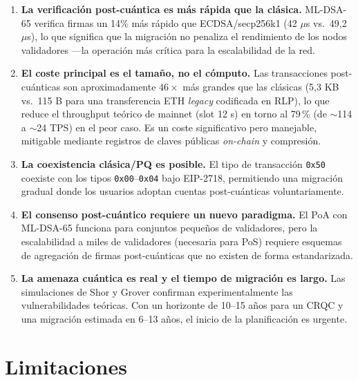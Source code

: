 \begin{enumerate}
  \item \textbf{La verificación post-cuántica es más rápida que la clásica.} ML-DSA-65 verifica firmas un 14\% más rápido que ECDSA/secp256k1 (42 $\mu$s vs.\ 49,2 $\mu$s), lo que significa que la migración no penaliza el rendimiento de los nodos validadores ---la operación más crítica para la escalabilidad de la red.
  
  \item \textbf{El coste principal es el tamaño, no el cómputo.} Las transacciones post-cuánticas son aproximadamente $46\times$ más grandes que las clásicas (5,3 KB vs.\ 115 B para una transferencia ETH \emph{legacy} codificada en RLP), lo que reduce el throughput teórico de mainnet (slot 12 s) en torno al 79\,\% (de $\sim$114 a $\sim$24 TPS) en el peor caso. Es un coste significativo pero manejable, mitigable mediante registros de claves públicas \emph{on-chain} y compresión.
  
  \item \textbf{La coexistencia clásica/PQ es posible.} El tipo de transacción \texttt{0x50} coexiste con los tipos \texttt{0x00}--\texttt{0x04} bajo EIP-2718, permitiendo una migración gradual donde los usuarios adoptan cuentas post-cuánticas voluntariamente.
  
  \item \textbf{El consenso post-cuántico requiere un nuevo paradigma.} El PoA con ML-DSA-65 funciona para conjuntos pequeños de validadores, pero la escalabilidad a miles de validadores (necesaria para PoS) requiere esquemas de agregación de firmas post-cuánticas que no existen de forma estandarizada.
  
  \item \textbf{La amenaza cuántica es real y el tiempo de migración es largo.} Las simulaciones de Shor y Grover confirman experimentalmente las vulnerabilidades teóricas. Con un horizonte de 10--15 años para un CRQC y una migración estimada en 6--13 años, el inicio de la planificación es urgente.
\end{enumerate}


\section{Limitaciones}
\label{sec:limitaciones}

